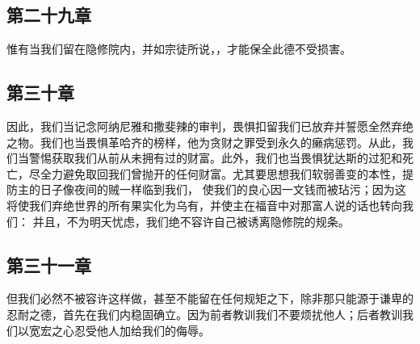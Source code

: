 
\subsection{第二十九章}

\par

惟有当我们留在隐修院内，并如宗徒所说，，才能保全此德不受损害。\par


\subsection{第三十章}

\par

因此，我们当记念阿纳尼雅和撒斐辣的审判，畏惧扣留我们已放弃并誓愿全然弃绝之物。我们也当畏惧革哈齐的榜样，他为贪财之罪受到永久的癞病惩罚。从此，我们当警惕获取我们从前从未拥有过的财富。此外，我们也当畏惧犹达斯的过犯和死亡，尽全力避免取回我们曾抛开的任何财富。尤其要思想我们软弱善变的本性，提防主的日子像夜间的贼一样临到我们， 使我们的良心因一文钱而被玷污；因为这将使我们弃绝世界的所有果实化为乌有，并使主在福音中对那富人说的话也转向我们： 并且，不为明天忧虑，我们绝不容许自己被诱离隐修院的规条。\par


\subsection{第三十一章}

\par

但我们必然不被容许这样做，甚至不能留在任何规矩之下，除非那只能源于谦卑的忍耐之德，首先在我们内稳固确立。因为前者教训我们不要烦扰他人；后者教训我们以宽宏之心忍受他人加给我们的侮辱。\par


